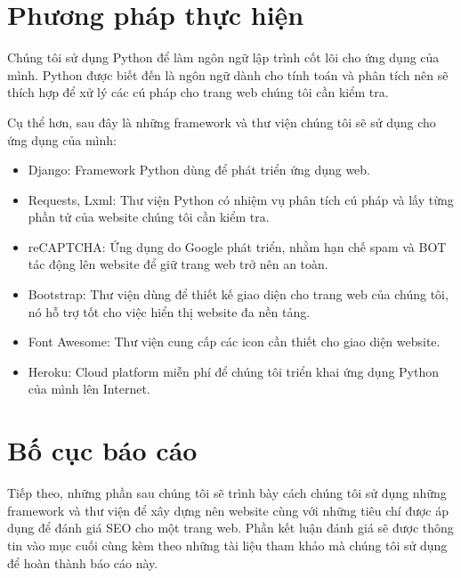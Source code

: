 \section{Phương pháp thực hiện}
Chúng tôi sử dụng Python để làm ngôn ngữ lập trình cốt lõi cho ứng dụng của mình. Python được biết đến là ngôn ngữ dành cho tính toán và phân tích nên sẽ thích hợp để xử lý các cú pháp cho trang web chúng tôi cần kiểm tra.
\par
Cụ thể hơn, sau đây là những framework và thư viện chúng tôi sẽ sử dụng cho ứng dụng của mình:
\begin{itemize}
	\item Django: Framework Python dùng để phát triển ứng dụng web.
	\item Requests, Lxml: Thư viện Python có nhiệm vụ phân tích cú pháp và lấy từng phần tử của website chúng tôi cần kiểm tra.
	\item reCAPTCHA: Ứng dụng do Google phát triển, nhằm hạn chế spam và BOT tác động lên website để giữ trang web trở nên an toàn.
	\item Bootstrap: Thư viện dùng để thiết kế giao diện cho trang web của chúng tôi, nó hỗ trợ tốt cho việc hiển thị website đa nền tảng.
	\item Font Awesome: Thư viện cung cấp các icon cần thiết cho giao diện website.
	\item Heroku: Cloud platform miễn phí để chúng tôi triển khai ứng dụng Python của mình lên Internet.
\end{itemize}
\section{Bố cục báo cáo}
Tiếp theo, những phần sau chúng tôi sẽ trình bày cách chúng tôi sử dụng những framework và thư viện để xây dựng nên website cùng với những tiêu chí được áp dụng để đánh giá SEO cho một trang web. Phần kết luận đánh giá sẽ được thông tin vào mục cuối cùng kèm theo những tài liệu tham khảo mà chúng tôi sử dụng để hoàn thành báo cáo này.